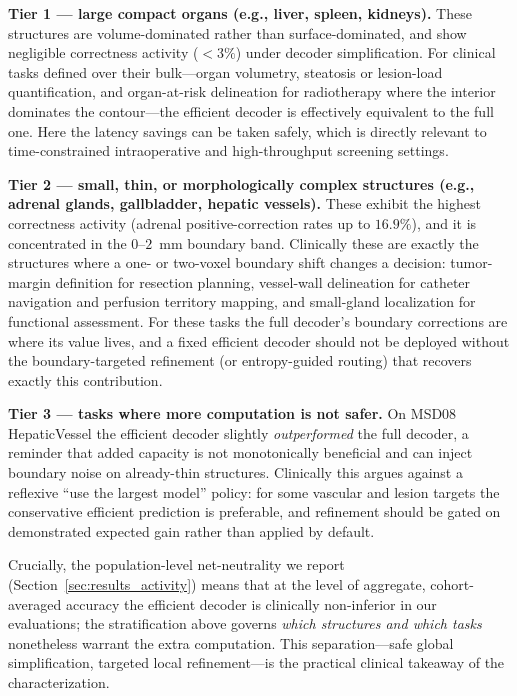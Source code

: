 \textbf{Tier 1 --- large compact organs (e.g., liver, spleen, kidneys).} These structures are volume-dominated rather than surface-dominated, and show negligible correctness activity ($<3\%$) under decoder simplification. For clinical tasks defined over their bulk---organ volumetry, steatosis or lesion-load quantification, and organ-at-risk delineation for radiotherapy where the interior dominates the contour---the efficient decoder is effectively equivalent to the full one. Here the latency savings can be taken safely, which is directly relevant to time-constrained intraoperative and high-throughput screening settings.

\textbf{Tier 2 --- small, thin, or morphologically complex structures (e.g., adrenal glands, gallbladder, hepatic vessels).} These exhibit the highest correctness activity (adrenal positive-correction rates up to $16.9\%$), and it is concentrated in the $0$--$2$~mm boundary band. Clinically these are exactly the structures where a one- or two-voxel boundary shift changes a decision: tumor-margin definition for resection planning, vessel-wall delineation for catheter navigation and perfusion territory mapping, and small-gland localization for functional assessment. For these tasks the full decoder's boundary corrections are where its value lives, and a fixed efficient decoder should not be deployed without the boundary-targeted refinement (or entropy-guided routing) that recovers exactly this contribution.

\textbf{Tier 3 --- tasks where more computation is not safer.} On MSD08 HepaticVessel the efficient decoder slightly \emph{outperformed} the full decoder, a reminder that added capacity is not monotonically beneficial and can inject boundary noise on already-thin structures. Clinically this argues against a reflexive ``use the largest model'' policy: for some vascular and lesion targets the conservative efficient prediction is preferable, and refinement should be gated on demonstrated expected gain rather than applied by default.

Crucially, the population-level net-neutrality we report (Section~\ref{sec:results_activity}) means that at the level of aggregate, cohort-averaged accuracy the efficient decoder is clinically non-inferior in our evaluations; the stratification above governs \emph{which structures and which tasks} nonetheless warrant the extra computation. This separation---safe global simplification, targeted local refinement---is the practical clinical takeaway of the characterization.

